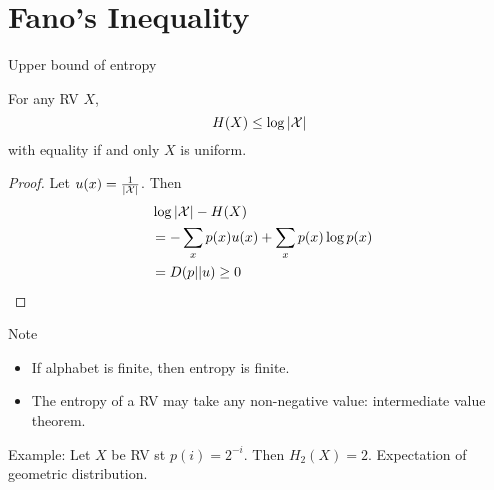 \documentclass[../main.tex]{subfiles}
\begin{document}
\section{Fano's Inequality}
\begin{bbox}{Upper bound of entropy}
    \begin{theorem*}
        For any RV $X$, \begin{equation*}
            H(X)\leq \log |\mathcal{X}|
        \end{equation*} with equality if and only $X$ is uniform.
    \end{theorem*}
    \begin{proof}
        Let $u(x)=\frac{1}{|\mathcal{X}|}$. Then \begin{align*}
            &\log |\mathcal{X}|-H(X)\\\
            &= -\sum_x p(x)u(x) + \sum_x p(x)\log p(x)\\
            &=D(p||u)\geq 0
        \end{align*}
    \end{proof}
\end{bbox}
Note \begin{itemize}
    \item If alphabet is finite, then entropy is finite.
    \item The entropy of a RV may take any non-negative value: intermediate value theorem.
\end{itemize}
Example: Let $X$ be RV st $p(i)=2^{-i}$. Then $H_{2}(X)=2$. Expectation of geometric distribution.
\end{document}
